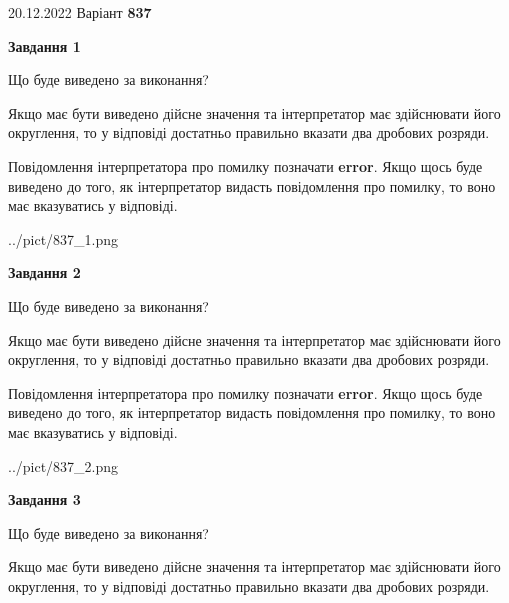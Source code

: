 \documentclass[12pt, ukrainian]{article}
\begin{document}
{20.12.2022 Варіант \No \textbf { 837 }\par}
{
\begin {Large}

{\begin {center}\textbf{Завдання 1}\end {center}}\par
Що буде виведено за виконання? \par

Якщо має бути виведено дійсне значення та інтерпретатор має здійснювати його округлення, 
то у відповіді достатньо правильно вказати два дробових розряди.

Повідомлення інтерпретатора про помилку позначати \textbf{error}.
Якщо щось буде виведено до того, як інтерпретатор видасть повідомлення про помилку, 
то воно має вказуватись у відповіді. \par

\begin{center}
	{../pict/837_1.png}
\end{center}
\newpage

{\begin {center}\textbf{Завдання 2}\end {center}}\par
Що буде виведено за виконання? \par

Якщо має бути виведено дійсне значення та інтерпретатор має здійснювати його округлення, 
то у відповіді достатньо правильно вказати два дробових розряди.

Повідомлення інтерпретатора про помилку позначати \textbf{error}.
Якщо щось буде виведено до того, як інтерпретатор видасть повідомлення про помилку, 
то воно має вказуватись у відповіді. \par

\begin{center}
	{../pict/837_2.png}
\end{center}
\newpage

{\begin {center}\textbf{Завдання 3}\end {center}}\par
Що буде виведено за виконання? \par

Якщо має бути виведено дійсне значення та інтерпретатор має здійснювати його округлення, 
то у відповіді достатньо правильно вказати два дробових розряди.


\end{Large}}
\end{document}
